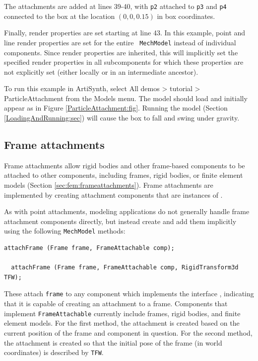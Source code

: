The attachments are added at lines 39-40, with {\tt p2} attached to
{\tt p3} and {\tt p4} connected to the box at the location $(0, 0,
0.15)$ in box coordinates. 

Finally, render properties are set starting at line 43. In this
example, point and line render properties are set for the entire {\tt
MechModel} instead of individual components.  Since render properties
are inherited, this will implicitly set the specified render
properties in all subcomponents for which these properties are not
explicitly set (either locally or in an intermediate ancestor).

To run this example in ArtiSynth, select {\sf All demos > tutorial >
ParticleAttachment} from the {\sf Models} menu. The model should load
and initially appear as in Figure \ref{ParticleAttachment:fig}.
Running the model (Section \ref{LoadingAndRunning:sec}) will cause the
box to fall and swing under gravity.

\subsection{Frame attachments}
\label{sec:mech:frameattachments}

Frame attachments allow rigid bodies and other frame-based components to
be attached to other components, including frames, rigid
bodies, or finite element models (Section \ref{sec:fem:frameattachments}).
Frame attachments are implemented by creating attachment components that are
instances of .

As with point attachments, modeling applications do not generally
handle frame attachment components directly, but instead create and
add them
implicitly using the following {\tt MechModel} methods:
\begin{lstlisting}[]
  attachFrame (Frame frame, FrameAttachable comp);

  attachFrame (Frame frame, FrameAttachable comp, RigidTransform3d TFW);
\end{lstlisting}
%
These attach {\tt frame} to any component which implements the
interface ,
indicating that it is capable of creating an attachment to a
frame. Components that implement {\tt FrameAttachable} currently
include frames, rigid bodies, and finite element models.  For the
first method, the attachment is created based on the current
position of the frame and component in question. For the second
method, the attachment is created so that the initial pose of the frame
(in world coordinates) is described by {\tt TFW}.

